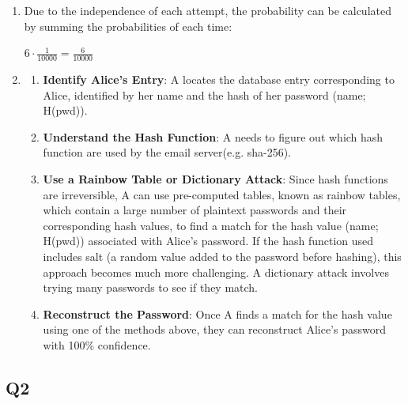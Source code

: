 \documentclass{article}
\begin{document}
	\begin{enumerate}
		\item Due to the independence of each attempt, the probability can be calculated by summing the probabilities of each time:
		\begin{center}
			$6 \cdot \frac{1}{10000} = \frac{6}{10000}$
		\end{center}

		\item 
		\begin{enumerate}
	    \item \textbf{Identify Alice's Entry}: A locates the database entry corresponding to Alice, identified by her name and the hash of her password (name; H(pwd)).
	    \item \textbf{Understand the Hash Function}: A needs to figure out which hash function are used by the email server(e.g. sha-256).
	    \item \textbf{Use a Rainbow Table or Dictionary Attack}: Since hash functions are irreversible, A can use pre-computed tables, known as rainbow tables, which contain a large number of plaintext passwords and their corresponding hash values, to find a match for the hash value (name; H(pwd)) associated with Alice's password\cite{4_Identification}. If the hash function used includes salt (a random value added to the password before hashing), this approach becomes much more challenging. A dictionary attack involves trying many passwords to see if they match.
	    \item \textbf{Reconstruct the Password}: Once A finds a match for the hash value using one of the methods above, they can reconstruct Alice's password with 100\% confidence.
	\end{enumerate}
\end{enumerate}

\subsection{Q2}
\end{document}
